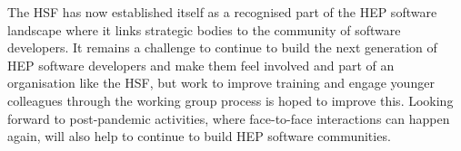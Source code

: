 \documentclass{article}
\begin{document}
The HSF has now established itself as a recognised part of the HEP
software landscape where it links strategic bodies to the community of
software developers. It remains a challenge to continue to build the
next generation of HEP software developers and make them feel involved
and part of an organisation like the HSF, but work to improve training
and engage younger colleagues through the working group process is hoped
to improve this. Looking forward to post-pandemic activities, where
face-to-face interactions can happen again, will also help to continue
to build HEP software communities.


\sloppy
\raggedright
\clearpage
\printbibliography[title={References},heading=bibintoc]
\end{document}
